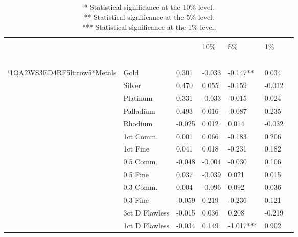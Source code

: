 \documentclass[preprint,authoryear,11pt]{elsarticle}
\begin{document}
\begin{table}[htp!]
	\caption{\newline }
	\renewcommand\arraystretch{0.65}
	\begin{tabularx}{\linewidth}{*{6}{>{\raggedleft\arraybackslash\small}p{.14\linewidth}}S[table-format=1.3]}
		\hline
		 \\
		\hline
		&     &   &  \\
		&    &        & 10\% & 5\% & 1\% \\
		\hline
		\mu\\\\\\\\\\\][\'\'
		
		
		
		
		
		\']
		 `1QA2WS3ED4RF5ltirow{5}{*}{Metals} & Gold & 0.301 & -0.033 & -0.147** & 0.034 \\
		                            & Silver & 0.470 & 0.055 & -0.159 & -0.012 \\
		                            & Platinum & 0.331 & -0.033 & -0.015 & 0.024 \\
		                            & Palladium & 0.493 & 0.016 & -0.087 & 0.235 \\
		                            & Rhodium & -0.025 & 0.012 & 0.014 & -0.032\\
		\hline
		 & 1ct Comm. & 0.001 & 0.066 & -0.183 & 0.206 \\
		                          & 1ct Fine & 0.041 & 0.018 & -0.231 & 0.182 \\
		                          & 0.5 Comm. & -0.048 & -0.004 & -0.030 & 0.106 \\
		                          & 0.5 Fine & 0.037 & -0.039 & 0.021 & 0.015 \\
		                          & 0.3 Comm. & 0.004 & -0.096 & 0.092 & 0.036 \\
		                          & 0.3 Fine & -0.059 & 0.219 & -0.236 & 0.121 \\
		                          & 3ct D Flawless & -0.015 & 0.036 & 0.208 & -0.219 \\
		                          & 1ct D Flawless & -0.034 & 0.149 & -1.017*** & 0.902 \\
		\hline
	\end{tabularx}
	\caption*{\newline
	*   Statistical significance at the 10\% level.\\
	**  Statistical significance at the 5\% level.\\
	*** Statistical significance at the 1\% level.}
\end{table}
\end{document}
